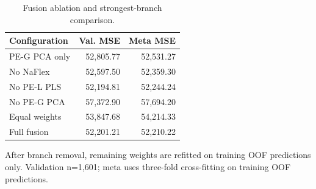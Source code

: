 \begin{table}[t]
\centering
\caption{Fusion ablation and strongest-branch comparison.}
\label{tab:fusion-ablation-zh}
\small
\setlength{\tabcolsep}{3pt}
\begin{tabular*}{\columnwidth}{@{\extracolsep{\fill}}lrr@{}}
\hline
Configuration & Val. MSE & Meta MSE \\
\hline
PE-G PCA only & 52,805.77 & 52,531.27 \\
No NaFlex & 52,597.50 & 52,359.30 \\
No PE-L PLS & 52,194.81 & 52,244.24 \\
No PE-G PCA & 57,372.90 & 57,694.20 \\
Equal weights & 53,847.68 & 54,214.33 \\
Full fusion & 52,201.21 & 52,210.22 \\
\hline
\end{tabular*}
\par\smallskip
\begin{minipage}{\columnwidth}\scriptsize
After branch removal, remaining weights are refitted on training OOF predictions only. Validation n=1,601; meta uses three-fold cross-fitting on training OOF predictions.
\end{minipage}
\end{table}
